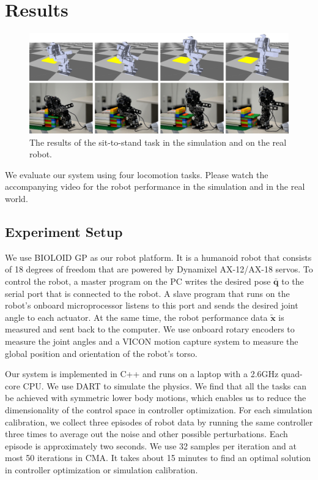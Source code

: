 \section{Results}

\begin{figure}[!t]
  \centering
  \includegraphics[width=\textwidth]{figures/sit2Stand}
  \caption{The results of the sit-to-stand task in the simulation and on the real robot.}
  \vspace{-0.1in}
  \label{fig:sit2Stand}
\end{figure}

We evaluate our system using four locomotion tasks. Please watch the accompanying video for the robot performance in the simulation and in the real world.

\subsection{Experiment Setup}

We use BIOLOID GP as our robot platform. It is a humanoid robot that consists of 18 degrees of freedom that are powered by Dynamixel AX-12/AX-18 servos. To control the robot, a master program on the PC writes the desired pose $\bar{\mathbf{q}}$ to the serial port that is connected to the robot. A slave program that runs on the robot's onboard microprocessor listens to this port and sends the desired joint angle to each actuator. At the same time, the robot performance data $\tilde{\mathbf{x}}$ is measured and sent back to the computer. We use onboard rotary encoders to measure the joint angles and a VICON motion capture system to measure the global position and orientation of the robot's torso.

Our system is implemented in C++ and runs on a laptop with a 2.6GHz quad-core CPU. We use DART to simulate the physics. We find that all the tasks can be achieved with symmetric lower body motions, which enables us to reduce the dimensionality of the control space in controller optimization. For each simulation calibration, we collect three episodes of robot data by running the same controller three times to average out the noise and other possible perturbations. Each episode is approximately two seconds. We use 32 samples per iteration and at most 50 iterations in CMA. It takes about 15 minutes to find an optimal solution in controller optimization or simulation calibration.

